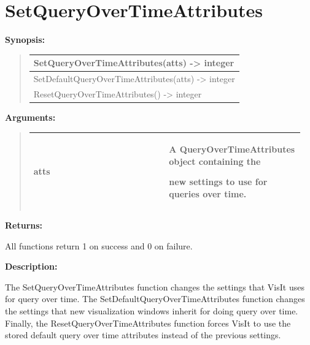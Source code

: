\documentclass[letterpaper,10pt,english]{sphinxmanual}
\begin{document}
\section{SetQueryOverTimeAttributes}
\label{functions:setqueryovertimeattributes}
\begin{DUlineblock}{0em}
\item[] \textbf{Synopsis:}
\end{DUlineblock}
\begin{quote}

\begin{tabulary}{\linewidth}{|L|}
\hline

SetQueryOverTimeAttributes(atts) -\textgreater{} integer
\\
\hline
SetDefaultQueryOverTimeAttributes(atts) -\textgreater{} integer
\\
\hline
ResetQueryOverTimeAttributes() -\textgreater{} integer
\\
\hline\end{tabulary}

\end{quote}

\begin{DUlineblock}{0em}
\item[] 
\item[] \textbf{Arguments:}
\end{DUlineblock}
\begin{quote}

\begin{tabular}{|p{0.475\linewidth}|p{0.475\linewidth}|}
\hline

atts
 & 
\begin{DUlineblock}{0em}
\item[] A QueryOverTimeAttributes object containing the
\item[] new settings to use for queries over time.
\end{DUlineblock}
\\
\hline\end{tabular}

\end{quote}

\begin{DUlineblock}{0em}
\item[] 
\item[] \textbf{Returns:}
\item[] All functions return 1 on success and 0 on failure.
\item[] 
\item[] \textbf{Description:}
\item[] The SetQueryOverTimeAttributes function changes the settings that VisIt
uses for query over time. The SetDefaultQueryOverTimeAttributes function
changes the settings that new visualization windows inherit for doing query
over time. Finally, the ResetQueryOverTimeAttributes function forces VisIt
to use the stored default query over time attributes instead of the
previous settings.
\end{DUlineblock}
\end{document}
